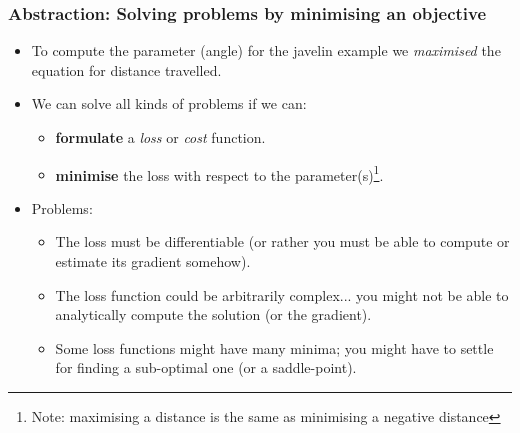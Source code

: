 \documentclass[]{article}
\begin{document}
\begin{frame}
\frametitle{Abstraction: Solving problems by minimising an objective}

\begin{itemize}
	\item<+-> To compute the parameter (angle) for the javelin example we \emph{maximised} the equation for distance travelled.
	\item<+-> We can solve all kinds of problems if we can:
	\begin{itemize}
	 	\item \textbf{formulate} a \emph{loss} or \emph{cost} function.
	 	\item<+-> \textbf{minimise} the loss with respect to the parameter(s)\footnote{Note: maximising a distance is the same as minimising a negative distance}.
	 \end{itemize} 
	 \item<+-> Problems:
	 \begin{itemize}
	 	\item The loss must be differentiable (or rather you must be able to compute or estimate its gradient somehow).
	 	\item The loss function could be arbitrarily complex... you might not be able to analytically compute the solution (or the gradient).
	 	\item Some loss functions might have many minima; you might have to settle for finding a sub-optimal one (or a saddle-point).
	 \end{itemize}
\end{itemize}

\end{frame}
\end{document}
